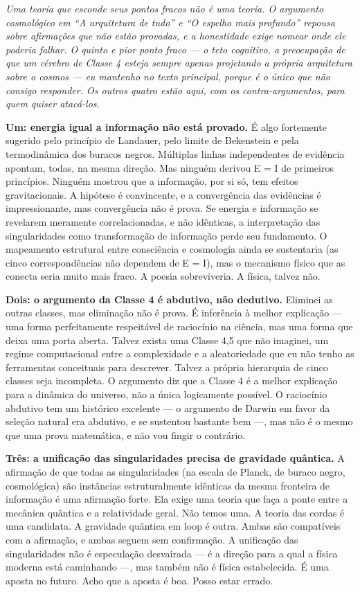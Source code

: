 \documentclass[11pt, twoside, openright]{book}
\begin{document}
\textit{Uma teoria que esconde seus pontos fracos não é uma teoria. O argumento cosmológico em ``A arquitetura de tudo'' e ``O espelho mais profundo'' repousa sobre afirmações que não estão provadas, e a honestidade exige nomear onde ele poderia falhar. O quinto e pior ponto fraco --- o teto cognitivo, a preocupação de que um cérebro de Classe 4 esteja sempre apenas projetando a própria arquitetura sobre o cosmos --- eu mantenho no texto principal, porque é o único que não consigo responder. Os outros quatro estão aqui, com os contra-argumentos, para quem quiser atacá-los.}

\textbf{Um: energia igual a informação não está provado.} É algo fortemente sugerido pelo princípio de Landauer, pelo limite de Bekenstein e pela termodinâmica dos buracos negros. Múltiplas linhas independentes de evidência apontam, todas, na mesma direção. Mas ninguém derivou E = I de primeiros princípios. Ninguém mostrou que a informação, por si só, tem efeitos gravitacionais. A hipótese é convincente, e a convergência das evidências é impressionante, mas convergência não é prova. Se energia e informação se revelarem meramente correlacionadas, e não idênticas, a interpretação das singularidades como transformação de informação perde seu fundamento. O mapeamento estrutural entre consciência e cosmologia ainda se sustentaria (as cinco correspondências não dependem de E = I), mas o mecanismo físico que as conecta seria muito mais fraco. A poesia sobreviveria. A física, talvez não.

\textbf{Dois: o argumento da Classe 4 é abdutivo, não dedutivo.} Eliminei as outras classes, mas eliminação não é prova. É inferência à melhor explicação --- uma forma perfeitamente respeitável de raciocínio na ciência, mas uma forma que deixa uma porta aberta. Talvez exista uma Classe 4,5 que não imaginei, um regime computacional entre a complexidade e a aleatoriedade que eu não tenho as ferramentas conceituais para descrever. Talvez a própria hierarquia de cinco classes seja incompleta. O argumento diz que a Classe 4 é a melhor explicação para a dinâmica do universo, não a única logicamente possível. O raciocínio abdutivo tem um histórico excelente --- o argumento de Darwin em favor da seleção natural era abdutivo, e se sustentou bastante bem ---, mas não é o mesmo que uma prova matemática, e não vou fingir o contrário.

\textbf{Três: a unificação das singularidades precisa de gravidade quântica.} A afirmação de que todas as singularidades (na escala de Planck, de buraco negro, cosmológica) são instâncias estruturalmente idênticas da mesma fronteira de informação é uma afirmação forte. Ela exige uma teoria que faça a ponte entre a mecânica quântica e a relatividade geral. Não temos uma. A teoria das cordas é uma candidata. A gravidade quântica em loop é outra. Ambas são compatíveis com a afirmação, e ambas seguem sem confirmação. A unificação das singularidades não é especulação desvairada --- é a direção para a qual a física moderna está caminhando ---, mas também não é física estabelecida. É uma aposta no futuro. Acho que a aposta é boa. Posso estar errado.
\end{document}
